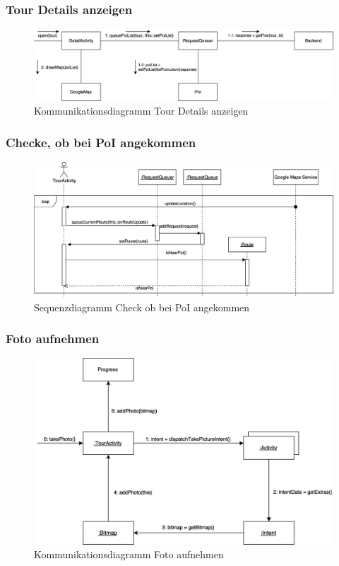 \documentclass[a4paper,10pt,xetex]{article}
\begin{document}
\subsubsection{Tour Details anzeigen}
\begin{figure}
  \includegraphics{Kommunikationsdiagramm_DetailActivity}
  \caption{Kommunikationsdiagramm Tour Details anzeigen}
\end{figure}

\subsubsection{Checke, ob bei PoI angekommen}
\begin{figure}
  \includegraphics{Sequenzdiagramm_IsNearPoi}
  \caption{Sequenzdiagramm Check ob bei PoI angekommen}
\end{figure}

\subsubsection{Foto aufnehmen}
\begin{figure}
  \includegraphics{Kommunikationsdiagramm_TakePhoto}
  \caption{Kommunikationsdiagramm Foto aufnehmen}
\end{figure}
\end{document}
